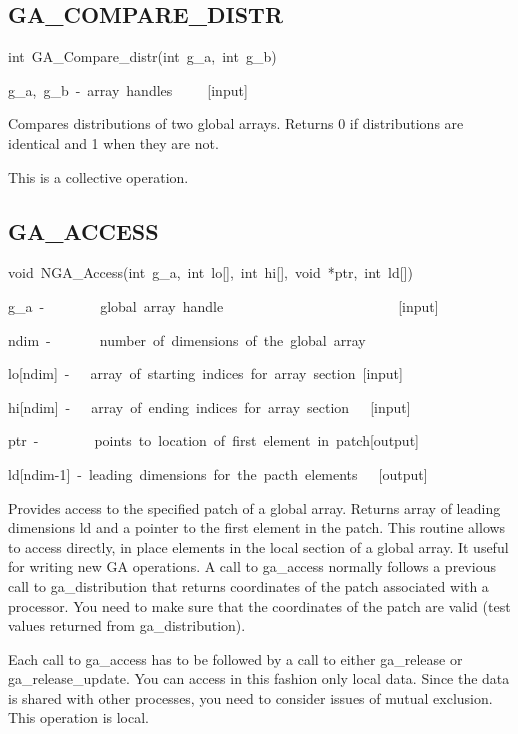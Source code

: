 \subsection*{\label{sub:GA_COMPARE_DISTR}GA\_COMPARE\_DISTR}
\begin{lyxcode}
int~GA\_Compare\_distr(int~g\_a,~int~g\_b)~



g\_a,~g\_b~-~array~handles~~~~~{[}input{]}
\end{lyxcode}
Compares distributions of two global arrays. Returns 0 if distributions
are identical and 1 when they are not.

This is a collective operation. 


\subsection*{\label{sub:GA_ACCESS}GA\_ACCESS}
\begin{lyxcode}
void~NGA\_Access(int~g\_a,~int~lo{[}{]},~int~hi{[}{]},~void~{*}ptr,~int~ld{[}{]})



g\_a~-~~~~~~~~global~array~handle~~~~~~~~~~~~~~~~~~~~~~~~~{[}input{]}

ndim~-~~~~~~~number~of~dimensions~of~the~global~array~

lo{[}ndim{]}~-~~~array~of~starting~indices~for~array~section~{[}input{]}

hi{[}ndim{]}~-~~~array~of~ending~indices~for~array~section~~~{[}input{]}

ptr~-~~~~~~~~points~to~location~of~first~element~in~patch{[}output{]}~

ld{[}ndim-1{]}~-~leading~dimensions~for~the~pacth~elements~~~{[}output{]}
\end{lyxcode}
Provides access to the specified patch of a global array. Returns
array of leading dimensions ld and a pointer to the first element
in the patch. This routine allows to access directly, in place elements
in the local section of a global array. It useful for writing new
GA operations. A call to ga\_access normally follows a previous call
to ga\_distribution that returns coordinates of the patch associated
with a processor. You need to make sure that the coordinates of the
patch are valid (test values returned from ga\_distribution).

Each call to ga\_access has to be followed by a call to either ga\_release
or ga\_release\_update. You can access in this fashion only local
data. Since the data is shared with other processes, you need to consider
issues of mutual exclusion. This operation is local. 


